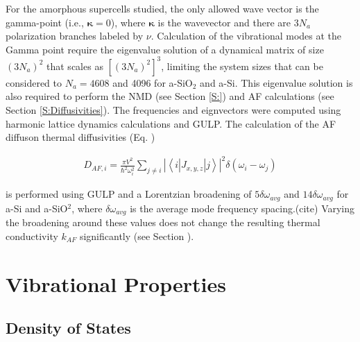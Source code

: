 \documentclass[aps,prb,twocolumn,superscriptaddress,footinbib,amsmath,amssymb,floatfix]{revtex4}
\begin{document}
For the amorphous supercells studied,
the only allowed wave vector is the gamma-point (i.e., $\pmb{\kappa}=0$),  
where $\pmb{\kappa}$ is the wavevector and there are $3N_a$ polarization 
branches labeled by $\nu$. 
Calculation of the 
vibrational modes at the Gamma point require the eigenvalue solution 
of a dynamical matrix of size 
$(3N_a)^2$ that scales as $[(3N_a)^2]^3$, limiting the system 
sizes that can be considered to $N_a = 4608$ and 4096 for a-SiO$_2$ and a-Si. 
This eigenvalue solution is also required to perform the NMD (see Section \ref{S:})  
and AF calculations (see Section \ref{S:Diffusivities}). 
The frequencies and eignvectors were computed using harmonic
lattice dynamics calculations and GULP.\cite{gale_general_2003} 
The calculation of the AF diffuson thermal diffusivities (Eq. ) 

\begin{equation}\label{EQ:k_sum}
\begin{split}
D_{AF,i} = \frac{\pi V^2}{\hbar^2\omega^2_i}\sum_{j\neq i}
|\left< i | J_{x,y,z} | j \right>|^2 \delta(\omega_i - \omega_j)
\end{split}
\end{equation}

is performed using GULP and a Lorentzian 
broadening of $5\delta\omega_{avg}$ and $14\delta\omega_{avg}$ for 
a-Si and a-SiO$^2$, where $\delta\omega_{avg}$ is the average mode 
frequency spacing.(cite) Varying the broadening around these values does not 
change the resulting thermal conductivity $k_{AF}$ significantly 
(see Section ). 

\section{\label{S:Vibrational}Vibrational Properties}

\subsection{\label{S:DOS}Density of States}
\end{document}
